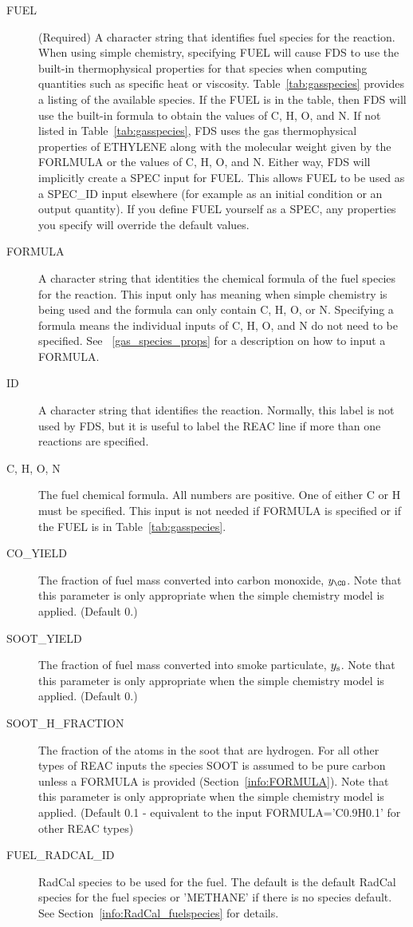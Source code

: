 \documentclass[11pt]{book}
\begin{document}
\begin{description}
\item[{\ct FUEL}] (Required) A character string that identifies fuel species for the reaction. When using simple chemistry, specifying {\ct FUEL} will
cause FDS to use the built-in thermophysical properties for that species when computing quantities such as specific heat or viscosity.
Table~\ref{tab:gasspecies} provides a listing of the available species.
If the {\ct FUEL} is in the table, then FDS will use the built-in formula to obtain the values of C, H, O, and N.
If not listed in Table~\ref{tab:gasspecies}, FDS uses the gas thermophysical properties of {\ct ETHYLENE} along with the molecular weight given by the {\ct FORLMULA} or the values of C, H, O, and N.  Either way, FDS will implicitly create a {\ct SPEC} input for {\ct FUEL}.  This allows {\ct FUEL} to be used as a {\ct SPEC\_ID} input elsewhere (for example as an initial condition or an output quantity).  If you define {\ct FUEL} yourself as a {\ct SPEC}, any properties you specify will override the default values.
\item[{\ct FORMULA}] A character string that identities the chemical formula of the fuel species for the reaction.
This input only has meaning when simple chemistry is being used and the formula can only contain C, H, O, or N.
Specifying a formula means the individual inputs of C, H, O, and N do not need to be specified. See ~\ref{gas_species_props} for a description on how to input a {\ct FORMULA}.
\item[{\ct ID}] A character string that identifies the reaction. Normally, this label is not used by FDS, but it is useful to
label the {\ct REAC} line if more than one reactions are specified.
\item[{\ct C, H, O, N}] The fuel chemical formula. All numbers are positive.  One of either {\ct C} or {\ct H} must be specified.
This input is not needed if {\ct FORMULA} is specified or if the {\ct FUEL} is in Table~\ref{tab:gasspecies}.
\item[{\ct CO\_YIELD}] The fraction of fuel mass converted into carbon monoxide, $y_{\CO}$. Note that this parameter is only appropriate when the
simple chemistry model is applied. (Default 0.)
\item[{\ct SOOT\_YIELD}] The fraction of fuel mass converted into smoke particulate, $y_{\rm s}$.
Note that this parameter is only appropriate when the simple chemistry model is applied.  (Default 0.)
\item[{\ct SOOT\_H\_FRACTION}] The fraction of the atoms in the soot that are hydrogen.
For all other types of {\ct REAC} inputs the species {\ct SOOT} is assumed to be pure carbon unless a {\ct FORMULA} is provided (Section~\ref{info:FORMULA}).
Note that this parameter is only appropriate when the simple chemistry model is applied.
(Default 0.1 - equivalent to the input {\ct FORMULA='C0.9H0.1'} for other {\ct REAC} types)
\item[{\ct FUEL\_RADCAL\_ID}] RadCal species to be used for the fuel.  The default is the default RadCal species for the fuel species or {\ct 'METHANE'} if there is no species default. See Section~\ref{info:RadCal_fuelspecies} for details.
\end{description}
\end{document}
